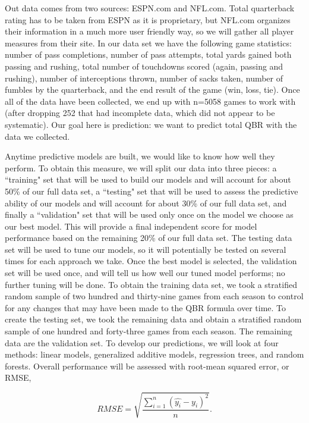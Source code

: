 \documentclass[12pt]{article}\usepackage[]{graphicx}\usepackage[]{color}
\begin{document}
Out data comes from two sources: ESPN.com and NFL.com. Total quarterback rating has to be taken from ESPN as it is proprietary, but NFL.com organizes their information in a much more user friendly way, so we will gather all player measures from their site. In our data set we have the following game statistics: number of pass completions, number of pass attempts, total yards gained both passing and rushing, total number of touchdowns scored (again, passing and rushing), number of interceptions thrown, number of sacks taken, number of fumbles by the quarterback, and the end result of the game (win, loss, tie). Once all of the data have been collected, we end up with n=5058 games to work with (after dropping 252 that had incomplete data, which did not appear to be systematic). Our goal here is prediction: we want to predict total QBR with the data we collected. 

Anytime predictive models are built, we would like to know how well they perform. To obtain this measure, we will split our data into three pieces: a ``training" set that will be used to build our models and will account for about 50\% of our full data set, a ``testing" set that will be used to assess the predictive ability of our models and will account for about 30\% of our full data set, and finally a ``validation" set that will be used only once on the model we choose as our best model. This will provide a final independent score for model performance based on the remaining 20\% of our full data set. The testing data set will be used to tune our models, so it will potentially be tested on several times for each approach we take. Once the best model is selected, the validation set will be used once, and will tell us how well our tuned model performs; no further tuning will be done. To obtain the training data set, we took a stratified random sample of two hundred and thirty-nine games from each season to control for any changes that may have been made to the QBR formula over time. To create the testing set, we took the remaining data and obtain a stratified random sample of one hundred and forty-three games from each season. The remaining data are the validation set. To develop our predictions, we will look at four methods: linear models, generalized additive models, regression trees, and random forests. Overall performance will be assessed with root-mean squared error, or RMSE,

\begin{equation*}
RMSE=\sqrt{\frac{\sum_{i=1}^n(\hat{y_{i}}-y_{i})^{2}}{n}}.
\end{equation*}
\end{document}
